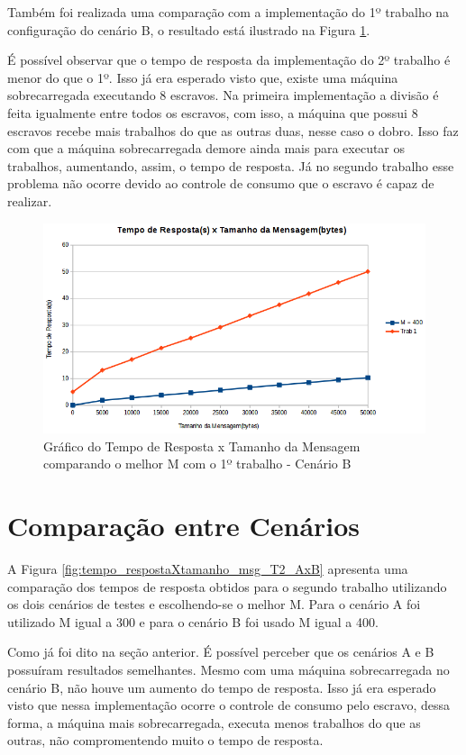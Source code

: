 \documentclass[
	12pt,				%
    oneside,			%
	a4paper,			%
	english,			%
	brazil,				%
	]{abntex2}
\begin{document}
Também foi realizada uma comparação com a implementação do 1º trabalho na configuração do cenário B, o resultado está ilustrado na Figura \ref{fig:tempo_respostaXtamanho_msg_B_T1}.

É possível observar que o tempo de resposta da implementação do 2º trabalho é menor do que o 1º. Isso já era esperado visto que, existe uma máquina sobrecarregada executando 8 escravos. Na primeira implementação a divisão é feita igualmente entre todos os escravos, com isso, a máquina que possui 8 escravos recebe mais trabalhos do que as outras duas, nesse caso o dobro. Isso faz com que a máquina sobrecarregada demore ainda mais para executar os trabalhos, aumentando, assim, o tempo de resposta. 
Já no segundo trabalho esse problema não ocorre devido ao controle de consumo que o escravo é capaz de realizar.

\begin{figure}[!htb]
\centering
\includegraphics[scale=0.7]{figuras/B_T1.png}
\caption{Gráfico do Tempo de Resposta x Tamanho da Mensagem comparando o melhor M com o 1º trabalho - Cenário B}
\label{fig:tempo_respostaXtamanho_msg_B_T1}
\end{figure}


\section{Comparação entre Cenários}

A Figura \ref{fig:tempo_respostaXtamanho_msg_T2_AxB} apresenta uma comparação dos tempos de resposta obtidos para o segundo trabalho utilizando os dois cenários de testes e escolhendo-se o melhor M. Para o cenário A foi utilizado M igual a 300 e para o cenário B foi usado M igual a 400.

Como já foi dito na seção anterior. É possível perceber que os cenários A e B possuíram resultados semelhantes.
Mesmo com uma máquina sobrecarregada no cenário B, não houve um aumento do tempo de resposta. Isso já era esperado visto que nessa implementação ocorre o controle de consumo pelo escravo, dessa forma, a máquina mais sobrecarregada, executa menos trabalhos do que as outras, não compromentendo muito o tempo de resposta.
\end{document}
